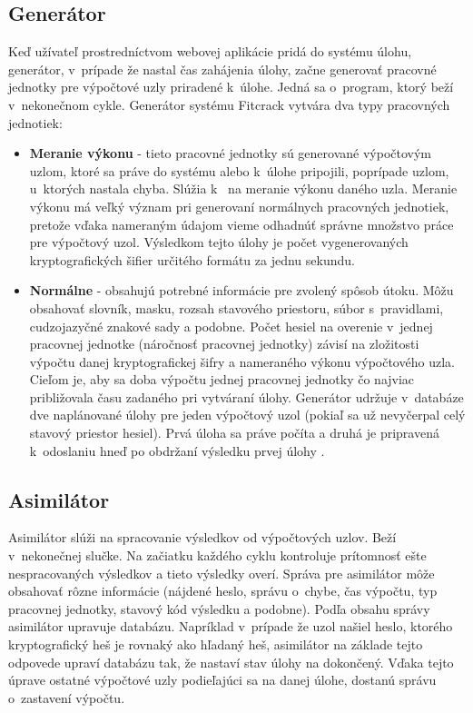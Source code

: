 \documentclass[zadani,slovak]{fitthesis}
\begin{document}
\subsection{Generátor}
Keď užívateľ prostredníctvom webovej aplikácie pridá do systému úlohu, generátor, v~prípade že nastal čas zahájenia úlohy, začne generovať pracovné jednotky pre výpočtové uzly priradené k~úlohe. Jedná sa o~program, ktorý beží v~nekonečnom cykle. Generátor systému Fitcrack vytvára dva typy pracovných jednotiek:
\begin{itemize}
    \item \textbf{Meranie výkonu} - tieto pracovné jednotky sú generované výpočtovým uzlom, ktoré sa práve do systému alebo k~úlohe pripojili, poprípade uzlom, u~ktorých nastala chyba. Slúžia k~ na meranie výkonu daného uzla. Meranie výkonu má veľký význam pri generovaní normálnych pracovných jednotiek, pretože vďaka nameraným údajom vieme odhadnúť správne množstvo práce pre výpočtový uzol. Výsledkom tejto úlohy je počet vygenerovaných kryptografických šifier určitého formátu za jednu sekundu. 
    \item \textbf{Normálne} - obsahujú potrebné informácie pre zvolený spôsob útoku. Môžu obsahovať slovník, masku, rozsah stavového priestoru, súbor s~pravidlami, cudzojazyčné znakové sady a podobne. Počet hesiel na overenie v~jednej pracovnej jednotke (náročnosť pracovnej jednotky) závisí na zložitosti výpočtu danej kryptografickej šifry a nameraného výkonu výpočtového uzla. Cieľom je, aby sa doba výpočtu jednej pracovnej jednotky čo najviac približovala času zadaného pri vytváraní úlohy. Generátor udržuje v~databáze dve naplánované úlohy pre jeden výpočtový uzol (pokiaľ sa už nevyčerpal celý stavový priestor hesiel). Prvá úloha sa práve počíta a druhá je pripravená k~odoslaniu hneď po obdržaní výsledku prvej úlohy \cite{EfficiencyDistributedPassword}.
\end{itemize}

\subsection{Asimilátor}
\label{asimilator}
Asimilátor slúži na spracovanie výsledkov od výpočtových uzlov. Beží v~nekonečnej slučke. Na začiatku každého cyklu kontroluje prítomnosť ešte nespracovaných výsledkov a tieto výsledky overí. Správa pre asimilátor môže obsahovať rôzne informácie (nájdené heslo, správu o~chybe, čas výpočtu, typ pracovnej jednotky, stavový kód výsledku a podobne). Podľa obsahu správy asimilátor upravuje databázu. Napríklad v~prípade že uzol našiel heslo, ktorého kryptografický heš je rovnaký ako hľadaný heš, asimilátor na základe tejto odpovede upraví databázu tak, že nastaví stav úlohy na dokončený. Vďaka tejto úprave ostatné výpočtové uzly podieľajúci sa na danej úlohe, dostanú správu o~zastavení výpočtu.
\end{document}

